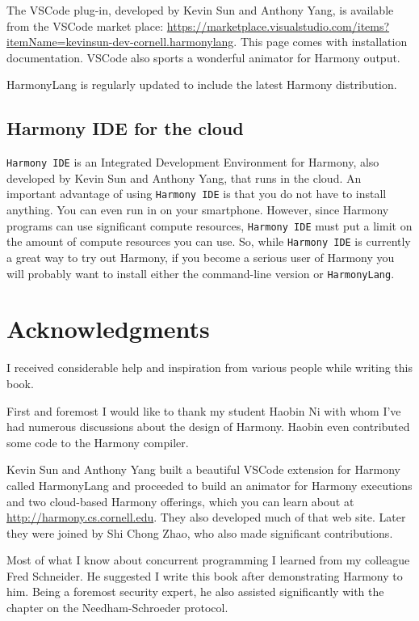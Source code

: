\documentclass{report}
\begin{document}
The VSCode plug-in, developed by Kevin Sun and Anthony Yang,
is available from the VSCode market place: \url{https://marketplace.visualstudio.com/items?itemName=kevinsun-dev-cornell.harmonylang}.
This page comes with installation documentation.  VSCode also sports a
wonderful animator for Harmony output.

HarmonyLang is regularly updated to include the latest Harmony distribution.

\section{Harmony IDE for the cloud}

\texttt{Harmony IDE} is an Integrated Development Environment for Harmony,
also developed by Kevin Sun and Anthony Yang,
that runs in the cloud.  An important advantage of using \texttt{Harmony IDE}
is that you do not have to install anything.  You can even run in on your
smartphone.  However, since Harmony programs can use significant compute
resources, \texttt{Harmony IDE} must put a limit on the amount of compute
resources you can use.  So, while \texttt{Harmony IDE} is currently a great
way to try out Harmony, if you become a serious user of Harmony you
will probably want to install either the command-line version or
\texttt{HarmonyLang}.

\cleardoublepage
{}
{}
\chapter*{Acknowledgments}

I received considerable help and inspiration from various people
while writing this book.

First and foremost I would like to thank my student Haobin Ni with
whom I've had numerous discussions about the design of Harmony.
Haobin even contributed some code to the Harmony compiler.

Kevin Sun and Anthony Yang built a beautiful VSCode extension for Harmony
called HarmonyLang and proceeded to build an animator for Harmony
executions and two cloud-based Harmony offerings, which you can learn
about at \url{http://harmony.cs.cornell.edu}.  They also developed much of
that web site.  Later they were joined by Shi Chong Zhao, who also
made significant contributions.

Most of what I know about concurrent programming I learned from
my colleague Fred Schneider.  He suggested I write this book after
demonstrating Harmony to him.  Being a foremost security expert, he also
assisted significantly with the chapter on the Needham-Schroeder protocol.
\end{document}
